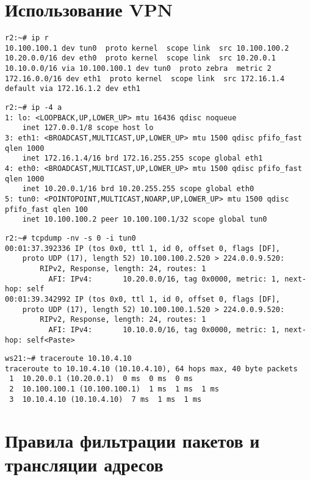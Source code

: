 \documentclass[a4paper,12pt]{article}
\begin{document}
\section{Использование VPN}

\begin{Verbatim}
r2:~# ip r
10.100.100.1 dev tun0  proto kernel  scope link  src 10.100.100.2 
10.20.0.0/16 dev eth0  proto kernel  scope link  src 10.20.0.1 
10.10.0.0/16 via 10.100.100.1 dev tun0  proto zebra  metric 2 
172.16.0.0/16 dev eth1  proto kernel  scope link  src 172.16.1.4 
default via 172.16.1.2 dev eth1 
\end{Verbatim}

\begin{Verbatim}
r2:~# ip -4 a
1: lo: <LOOPBACK,UP,LOWER_UP> mtu 16436 qdisc noqueue 
    inet 127.0.0.1/8 scope host lo
3: eth1: <BROADCAST,MULTICAST,UP,LOWER_UP> mtu 1500 qdisc pfifo_fast qlen 1000
    inet 172.16.1.4/16 brd 172.16.255.255 scope global eth1
4: eth0: <BROADCAST,MULTICAST,UP,LOWER_UP> mtu 1500 qdisc pfifo_fast qlen 1000
    inet 10.20.0.1/16 brd 10.20.255.255 scope global eth0
5: tun0: <POINTOPOINT,MULTICAST,NOARP,UP,LOWER_UP> mtu 1500 qdisc pfifo_fast qlen 100
    inet 10.100.100.2 peer 10.100.100.1/32 scope global tun0
\end{Verbatim}

\begin{Verbatim}
r2:~# tcpdump -nv -s 0 -i tun0
00:01:37.392336 IP (tos 0x0, ttl 1, id 0, offset 0, flags [DF],
	proto UDP (17), length 52) 10.100.100.2.520 > 224.0.0.9.520: 
        RIPv2, Response, length: 24, routes: 1
          AFI: IPv4:       10.20.0.0/16, tag 0x0000, metric: 1, next-hop: self
00:01:39.342992 IP (tos 0x0, ttl 1, id 0, offset 0, flags [DF],
	proto UDP (17), length 52) 10.100.100.1.520 > 224.0.0.9.520: 
        RIPv2, Response, length: 24, routes: 1
          AFI: IPv4:       10.10.0.0/16, tag 0x0000, metric: 1, next-hop: self<Paste>
\end{Verbatim}

\begin{Verbatim}
ws21:~# traceroute 10.10.4.10
traceroute to 10.10.4.10 (10.10.4.10), 64 hops max, 40 byte packets
 1  10.20.0.1 (10.20.0.1)  0 ms  0 ms  0 ms
 2  10.100.100.1 (10.100.100.1)  1 ms  1 ms  1 ms
 3  10.10.4.10 (10.10.4.10)  7 ms  1 ms  1 ms
\end{Verbatim}

\section{Правила фильтрации пакетов и трансляции адресов}
\end{document}
